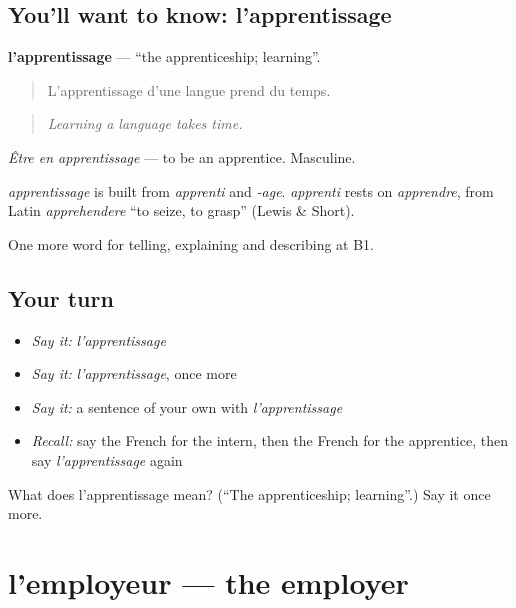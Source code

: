 \subsection*{You'll want to know: l'apprentissage}
\textbf{l'apprentissage} — \textquotedblleft{}the apprenticeship; learning\textquotedblright{}.

\begin{quote}
L'apprentissage d'une langue prend du temps.
\end{quote}

\begin{quote}
\emph{Learning a language takes time.}
\end{quote}

\emph{Être en apprentissage} — to be an apprentice. Masculine.

\begin{cousinweb}
\emph{apprentissage} is built from \emph{apprenti} and \emph{-age}. \emph{apprenti} rests on \emph{apprendre}, from Latin \emph{apprehendere} \textquotedblleft{}to seize, to grasp\textquotedblright{} (Lewis \& Short).
\end{cousinweb}

\begin{grammarlens}[title={What you've built}]
One more word for telling, explaining and describing at B1.
\end{grammarlens}

\subsection*{Your turn}
\begin{itemize}
\raggedright
  \item \emph{Say it:} \emph{l'apprentissage}
  \item \emph{Say it:} \emph{l'apprentissage}, once more
  \item \emph{Say it:} a sentence of your own with \emph{l'apprentissage}
  \item \emph{Recall:} say the French for the intern, then the French for the apprentice, then say \emph{l'apprentissage} again
\end{itemize}

\begin{tcolorbox}[breakable,colback=teal!4,colframe=teal!35!black,title={Before you move on}]
What does l'apprentissage mean? (\textquotedblleft{}The apprenticeship; learning\textquotedblright{}.) Say it once more.
\end{tcolorbox}
\section[l'employeur]{l'employeur — the employer}

